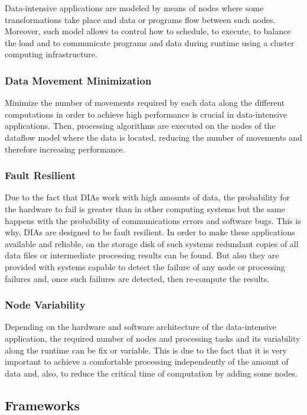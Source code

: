 Data-intensive applications are modeled by means of nodes where some transformations take place and data or programs flow between such nodes. Moreover, such model allows to control how to schedule, to execute, to balance the load and to communicate programs and data during runtime using a cluster computing infrastructure.

\subsubsection*{Data Movement Minimization}

Minimize the number of movements required by each data along the different computations in order to achieve high performance is crucial in data-intensive applications. Then, processing algorithms are executed on the nodes of the dataflow model where the data is located, reducing the number of movements and therefore increasing performance.

\subsubsection*{Fault Resilient}

Due to the fact that DIAs work with high amounts of data, the probability for the hardware to fail is greater than in other computing systems but the same happens with the probability of communications errors and software bugs. This is why, DIAs are designed to be fault resilient. In order to make these applications available and reliable, on the storage disk of such systems redundant copies of all data files or intermediate processing results can be found. But also they are provided with systems capable to detect the failure of any node or processing failures and, once such failures are detected, then re-compute the results.

\subsubsection*{Node Variability}

Depending on the hardware and software architecture of the data-intensive application, the required number of nodes and processing tasks and its variability along the runtime can be fix or variable. This is due to the fact that it is very important to achieve a comfortable processing independently of the amount of data and, also, to reduce the critical time of computation by adding some nodes.

\subsection{Frameworks}
